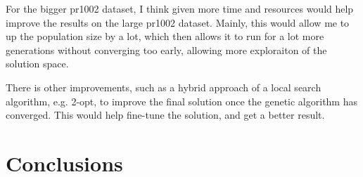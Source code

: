 \documentclass[11pt]{scrartcl} %
\begin{document}
For the bigger pr1002 dataset, I think given more time and resources would help improve the results on the large pr1002 dataset. 
Mainly, this would allow me to up the population size by a lot, which then allows it to run for a lot more generations without converging too early, allowing more exploraiton of the solution space.

There is other improvements, such as a hybrid approach of a local search algorithm, e.g. 2-opt, to improve the final solution once the genetic algorithm has converged. This would help fine-tune the solution, and get a better result.
\section{Conclusions}

\printbibliography
\end{document}
